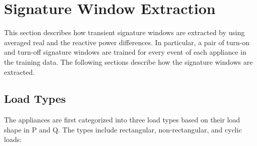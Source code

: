 \documentclass[conference]{IEEEtran}
\begin{document}

\section{Signature Window Extraction}\label{sec:training}
This section describes how transient signature windows are extracted by using averaged real and the reactive power differences.  In particular, a pair of turn-on and turn-off signature windows are trained for every event of each appliance in the training data.  The following sections describe how the signature windows are extracted.  


\subsection{Load Types}
The appliances are first categorized into three load types based on their load shape in P and Q.  The types include rectangular, non-rectangular, and cyclic loads:
\end{document}
